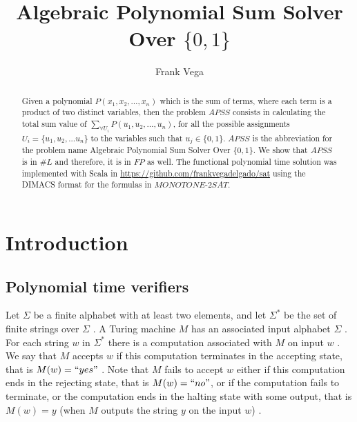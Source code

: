 \documentclass[a4paper,UKenglish,cleveref, autoref]{lipics-v2019}
\title{Algebraic Polynomial Sum Solver Over $\{0, 1\}$} %
\author{Frank Vega}{CopSonic, 1471 Route de Saint-Nauphary 82000 Montauban, France} {vega.frank@gmail.com}{https://orcid.org/0000-0001-8210-4126}{}
\begin{document}
\maketitle

\begin{abstract}
Given a polynomial $P(x_{1}, x_{2}, \ldots, x_{n})$ which is the sum of terms, where each term is a product of two distinct variables, then the problem $APSS$ consists in calculating the total sum value of $\sum_{\forall U_{i}} P(u_{1}, u_{2}, \ldots, u_{n})$, for all the possible assignments $U_{i} = \{u_{1}, u_{2}, ... u_{n}\}$ to the variables such that $u_{j} \in \{0, 1\}$. $APSS$ is the abbreviation for the problem name Algebraic Polynomial Sum Solver Over $\{0, 1\}$. We show that $APSS$ is in $\#L$ and therefore, it is in $FP$ as well. The functional polynomial time solution was implemented with Scala in \url{https://github.com/frankvegadelgado/sat} using the DIMACS format for the formulas in $\textit{MONOTONE-2SAT}$.
\end{abstract}

\section{Introduction}

\subsection{Polynomial time verifiers}

Let $\Sigma$ be a finite alphabet with at least two elements, and let $\Sigma^{*}$ be the set of finite strings over $\Sigma$ \cite{AB09}. A Turing machine $M$ has an associated input alphabet $\Sigma$ \cite{AB09}. For each string $w$ in $\Sigma^{*}$ there is a computation associated with $M$ on input $w$ \cite{AB09}. We say that $M$ accepts $w$ if this computation terminates in the accepting state, that is $M(w)=``yes"$ \cite{AB09}. Note that $M$ fails to accept $w$ either if this computation ends in the rejecting state, that is $M(w)=``no"$, or if the computation fails to terminate, or the computation ends in the halting state with some output, that is $M(w)=y$ (when $M$ outputs the string $y$ on the input $w$) \cite{AB09}.
\end{document}
